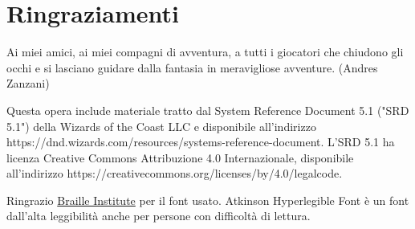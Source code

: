 \section{Ringraziamenti}

\begin{enfasi}{
			\begin{center}
Ai miei amici, ai miei compagni di avventura, a tutti i giocatori che chiudono gli occhi e si lasciano guidare dalla fantasia in meravigliose avventure. (Andres Zanzani)
			\end{center}
}\end{enfasi}

\medskip

Questa opera include materiale tratto dal System Reference Document 5.1 ("SRD 5.1") della Wizards of the Coast LLC e disponibile all'indirizzo https://dnd.wizards.com/resources/systems-reference-document. L'SRD 5.1 ha licenza Creative Commons Attribuzione 4.0 Internazionale, disponibile all'indirizzo https://creativecommons.org/licenses/by/4.0/legalcode.


\medskip


Ringrazio \href{https://www.brailleinstitute.org/freefont/}{Braille Institute} per il font usato. Atkinson Hyperlegible Font è un font dall'alta leggibilità anche per persone con difficoltà di lettura.

